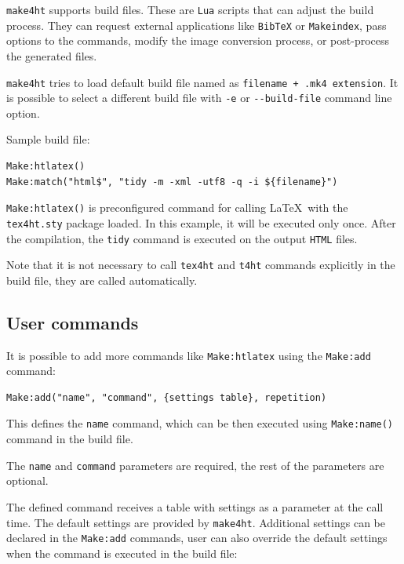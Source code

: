 \label{sec:buildfiles}

\texttt{make4ht} supports build files. These are \texttt{Lua} scripts
that can adjust the build process. They can request external
applications like \texttt{BibTeX} or \texttt{Makeindex}, pass options to
the commands, modify the image conversion process, or post-process the
generated files.

\texttt{make4ht} tries to load default build file named as
\texttt{filename\ +\ .mk4\ extension}. It is possible to select a
different build file with \texttt{-e} or \texttt{-\/-build-file} command
line option.

Sample build file:

\begin{verbatim}
Make:htlatex()
Make:match("html$", "tidy -m -xml -utf8 -q -i ${filename}")
\end{verbatim}

\texttt{Make:htlatex()} is preconfigured command for calling \LaTeX~with
the \texttt{tex4ht.sty} package loaded. In this example, it will be
executed only once. After the compilation, the \texttt{tidy} command is
executed on the output \texttt{HTML} files.

Note that it is not necessary to call \texttt{tex4ht} and \texttt{t4ht}
commands explicitly in the build file, they are called automatically.

\subsection{User commands}\label{user-commands}

It is possible to add more commands like \texttt{Make:htlatex} using the
\texttt{Make:add} command:

\begin{verbatim}
Make:add("name", "command", {settings table}, repetition)
\end{verbatim}

This defines the \texttt{name} command, which can be then executed using
\texttt{Make:name()} command in the build file.

The \texttt{name} and \texttt{command} parameters are required, the rest
of the parameters are optional.

The defined command receives a table with settings as a parameter at the
call time. The default settings are provided by \texttt{make4ht}.
Additional settings can be declared in the \texttt{Make:add} commands,
user can also override the default settings when the command is executed
in the build file:

